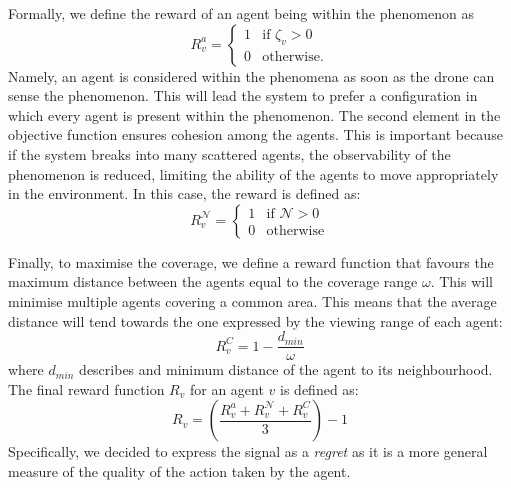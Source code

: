 \documentclass[conference]{IEEEtran}
\begin{document}
Formally, we define the reward of an agent being within the phenomenon as
 \begin{equation*}
 R^a_{v} = \begin{cases}
  1 & \text{if } \zeta_v > 0 \\
  0 & \text{otherwise.} 
 \end{cases}
 \end{equation*}
Namely, an agent is considered within the phenomena as soon as the drone can sense the phenomenon.
%
This will lead the system to prefer a configuration in which every agent is present within the phenomenon.
%
The second element in the objective function ensures cohesion among the agents. 
 This is important because if the system breaks into many scattered agents, 
 the observability of the phenomenon is reduced, 
 limiting the ability of the agents to move appropriately in the environment.
 In this case, the reward is defined as:
 \begin{equation*}
 R^{\mathcal{N}}_{v} = \begin{cases}
  1 & \text{if } \mathcal{N} > 0 \\
  0 & \text{otherwise} 
 \end{cases}
 \end{equation*}
 
Finally, to maximise the coverage, 
  we define a reward function that favours the maximum distance between the agents
  equal to the coverage range $\omega$. This will minimise multiple agents covering a common area.
%
This means that the average distance will tend towards the one expressed by the viewing range of each agent:
% 
\begin{equation*}
R^{C}_{v} = 1 - \frac{d_{min}}{\omega}
\end{equation*}
where $d_{min}$ describes and minimum distance of the agent to its neighbourhood. 
%
The final reward function $R_{v}$ for an agent $v$ is defined as:
\begin{equation*}
R_{v} = (\frac{R^a_{v} + R^{\mathcal{N}}_{v} + R^{C}_{v}}{3}) - 1
\end{equation*}
Specifically, we decided to express the signal as a \emph{regret}
  as it is a more general measure of the quality of the action taken by the agent.
%
\end{document}
